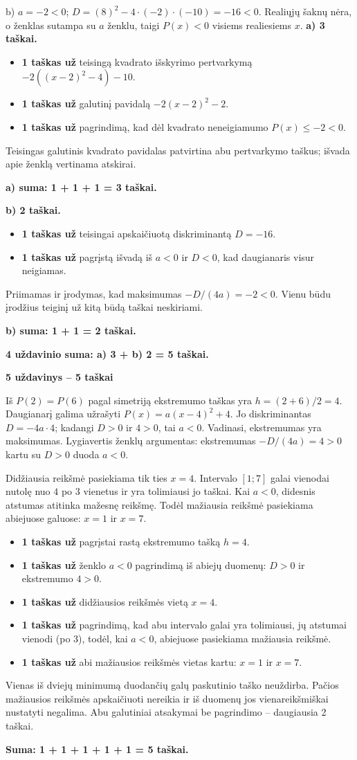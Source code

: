 \documentclass[11pt]{article}
\newcommand{\sk}[1]{\par\medskip\textbf{#1}\par}
\begin{document}
b) $a=-2<0$; $D=(8)^2-4\cdot(-2)\cdot(-10)=-16<0$. Realiųjų šaknų nėra, o ženklas sutampa su $a$ ženklu, taigi $P(x)<0$ visiems realiesiems $x$.
\textbf{a) 3 taškai.}\begin{itemize}
\item \textbf{1 taškas už} teisingą kvadrato išskyrimo pertvarkymą $-2((x-2)^2-4)-10$.
\item \textbf{1 taškas už} galutinį pavidalą $-2(x-2)^2-2$.
\item \textbf{1 taškas už} pagrindimą, kad dėl kvadrato neneigiamumo $P(x)\le-2<0$.
\end{itemize}
Teisingas galutinis kvadrato pavidalas patvirtina abu pertvarkymo taškus; išvada apie ženklą vertinama atskirai.\par\textbf{a) suma: 1 + 1 + 1 = 3 taškai.}\par\textbf{b) 2 taškai.}\begin{itemize}
\item \textbf{1 taškas už} teisingai apskaičiuotą diskriminantą $D=-16$.
\item \textbf{1 taškas už} pagrįstą išvadą iš $a<0$ ir $D<0$, kad daugianaris visur neigiamas.
\end{itemize}
Priimamas ir įrodymas, kad maksimumas $-D/(4a)=-2<0$. Vienu būdu įrodžius teiginį už kitą būdą taškai neskiriami.\par\textbf{b) suma: 1 + 1 = 2 taškai.}\par\textbf{4 uždavinio suma: a) 3 + b) 2 = 5 taškai.}

\sk{5 uždavinys -- 5 taškai}
Iš $P(2)=P(6)$ pagal simetriją ekstremumo taškas yra $h=(2+6)/2=4$. Daugianarį galima užrašyti $P(x)=a(x-4)^2+4$. Jo diskriminantas $D=-4a\cdot4$; kadangi $D>0$ ir $4>0$, tai $a<0$. Vadinasi, ekstremumas yra maksimumas. Lygiavertis ženklų argumentas: ekstremumas $-D/(4a)=4>0$ kartu su $D>0$ duoda $a<0$.

Didžiausia reikšmė pasiekiama tik ties $x=4$. Intervalo $[1;7]$ galai vienodai nutolę nuo $4$ po $3$ vienetus ir yra tolimiausi jo taškai. Kai $a<0$, didesnis atstumas atitinka mažesnę reikšmę. Todėl mažiausia reikšmė pasiekiama abiejuose galuose: $x=1$ ir $x=7$.
\begin{itemize}
\item \textbf{1 taškas už} pagrįstai rastą ekstremumo tašką $h=4$.
\item \textbf{1 taškas už} ženklo $a<0$ pagrindimą iš abiejų duomenų: $D>0$ ir ekstremumo $4>0$.
\item \textbf{1 taškas už} didžiausios reikšmės vietą $x=4$.
\item \textbf{1 taškas už} pagrindimą, kad abu intervalo galai yra tolimiausi, jų atstumai vienodi (po 3), todėl, kai $a<0$, abiejuose pasiekiama mažiausia reikšmė.
\item \textbf{1 taškas už} abi mažiausios reikšmės vietas kartu: $x=1$ ir $x=7$.
\end{itemize}
Vienas iš dviejų minimumą duodančių galų paskutinio taško neuždirba. Pačios mažiausios reikšmės apskaičiuoti nereikia ir iš duomenų jos vienareikšmiškai nustatyti negalima. Abu galutiniai atsakymai be pagrindimo -- daugiausia 2 taškai.\par\textbf{Suma: 1 + 1 + 1 + 1 + 1 = 5 taškai.}\newpage
\end{document}
